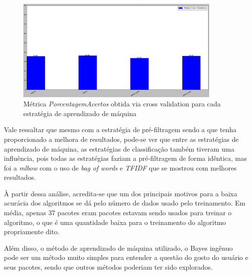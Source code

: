 \begin{figure}[h]
  \centering
  \includegraphics[width=0.9\textwidth]{figuras/segundo_experimento_cross_validation.eps}
    \caption{Métrica \textit{PorcentagemAcertos} obtida via cross validation para cada estratégia de aprendizado de máquina}
  \label{fig:segundo_experimento_cross_validation}
\end{figure}

Vale ressaltar que mesmo com a estratégia de pré-filtragem sendo a que tenha
proporcionado a melhora de resultados, pode-se ver que entre as estratégias de
aprendizado de máquina, as estratégias de classificação também tiveram uma
influência, pois todas as estratégias faziam a pré-filtragem de forma idêntica,
mas foi a \textit{mlbow} com o uso de \textit{bag of words} e \textit{TFIDF} que
se mostrou com melhores resultados.

À partir dessa análise, acredita-se que um dos principais motivos para a baixa acurácia dos algoritmos
se dá pelo número de dados usado pelo treinamento. Em média, apenas 37 pacotes
eram pacotes estavam sendo usados para treinar o algoritmo, o que é uma
quantidade baixa para o treinamento do algoritmo propriamente dito.

Além disso, o método de aprendizado de máquina utilizado, o Bayes ingênuo pode
ser um método muito simples para entender a questão do gosto do usuário e seus
pacotes, sendo que outros métodos poderiam ter sido explorados.
